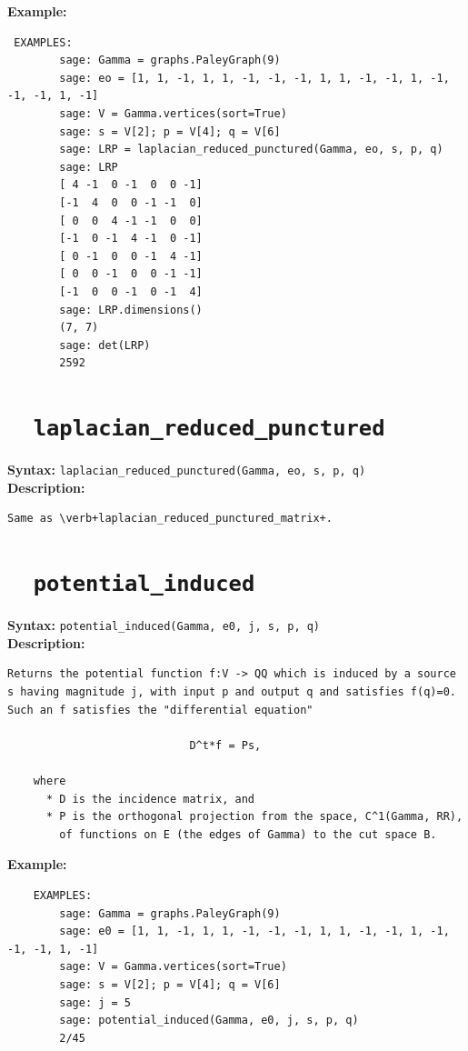 \documentclass{article}
\begin{document}
\textbf{Example:}
\begin{verbatim}
 EXAMPLES:
        sage: Gamma = graphs.PaleyGraph(9)
        sage: eo = [1, 1, -1, 1, 1, -1, -1, -1, 1, 1, -1, -1, 1, -1, -1, -1, 1, -1]
        sage: V = Gamma.vertices(sort=True)
        sage: s = V[2]; p = V[4]; q = V[6]
        sage: LRP = laplacian_reduced_punctured(Gamma, eo, s, p, q)
        sage: LRP
        [ 4 -1  0 -1  0  0 -1]
        [-1  4  0  0 -1 -1  0]
        [ 0  0  4 -1 -1  0  0]
        [-1  0 -1  4 -1  0 -1]
        [ 0 -1  0  0 -1  4 -1]
        [ 0  0 -1  0  0 -1 -1]
        [-1  0  0 -1  0 -1  4]
        sage: LRP.dimensions()
        (7, 7)
        sage: det(LRP)
        2592
\end{verbatim}

\section{\tt \ \ laplacian\_reduced\_punctured}

\textbf{Syntax:} \verb}laplacian_reduced_punctured(Gamma, eo, s, p, q)}\\

\textbf{Description:}
\begin{verbatim}
Same as \verb+laplacian_reduced_punctured_matrix+.
\end{verbatim}


\section{\tt \ \ potential\_induced}

\textbf{Syntax:} \verb}potential_induced(Gamma, e0, j, s, p, q)}\\

\textbf{Description:}
\begin{verbatim}
Returns the potential function f:V -> QQ which is induced by a source
s having magnitude j, with input p and output q and satisfies f(q)=0.
Such an f satisfies the "differential equation" 

                            D^t*f = Ps,

    where 
      * D is the incidence matrix, and
      * P is the orthogonal projection from the space, C^1(Gamma, RR), 
        of functions on E (the edges of Gamma) to the cut space B.
\end{verbatim}

\textbf{Example:}
\begin{verbatim}
    EXAMPLES:
        sage: Gamma = graphs.PaleyGraph(9)
        sage: e0 = [1, 1, -1, 1, 1, -1, -1, -1, 1, 1, -1, -1, 1, -1, -1, -1, 1, -1]
        sage: V = Gamma.vertices(sort=True)
        sage: s = V[2]; p = V[4]; q = V[6]
        sage: j = 5
        sage: potential_induced(Gamma, e0, j, s, p, q)
        2/45
\end{verbatim}
\end{document}
